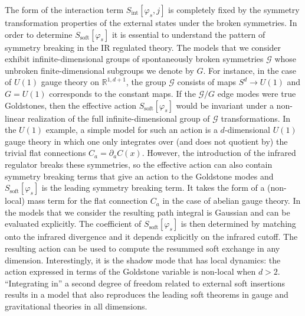 \documentclass[11pt]{article}
\begin{document}
The form of the interaction term $S_{\text{int}} [ \varphi_s , j ]$ is completely fixed by the symmetry transformation properties of the external states under the broken symmetries. In order to determine $S_{\text{soft}} [ \varphi_s ]$ it is essential to understand the pattern of symmetry breaking in the IR regulated theory. The models that we consider exhibit infinite-dimensional groups of spontaneously broken symmetries $\mathcal{G}$ whose unbroken finite-dimensional subgroups we denote by $G$. For instance, in the case of $U(1)$ gauge theory on $\mathbb{R}^{1,d+1}$, the group  $\mathcal{G}$ consists of maps $S^d \to U(1)$ and $G=U(1)$ corresponds to the constant maps. If the $\mathcal{G}/G$ edge modes were true Goldstones, then the effective action  $S_{\text{soft}} [ \varphi_s ]$ would be invariant under a non-linear realization of the full infinite-dimensional group of $\mathcal{G}$ transformations. In the $U(1)$ example, a simple model for such an action is a $d$-dimensional $U(1)$ gauge theory in which one only integrates over (and does not quotient by) the trivial flat connections $C_a=\partial_aC(x)$. However, the introduction of the infrared regulator breaks these symmetries, so the effective action can also contain symmetry breaking terms that give an action to the Goldstone modes and $S_{\text{soft}} [ \varphi_s ]$ is the leading symmetry breaking term. It takes the form of a (non-local) mass term for the flat connection $C_a$ in the case of abelian gauge theory. 
In the models that we consider the resulting path integral is Gaussian and can be evaluated explicitly. The coefficient of $S_{\text{soft}} [ \varphi_s ]$ is then determined by matching onto the infrared divergence and it depends explicitly on the infrared cutoff. The resulting action can be used to compute the resummed soft exchange in any dimension. Interestingly, it is the shadow mode that has local dynamics: the action expressed in terms of the Goldstone variable is non-local when $d>2$. ``Integrating in'' a second degree of freedom related to external soft insertions results in a model that also reproduces the leading soft theorems in gauge and gravitational theories in all dimensions.
\end{document}
